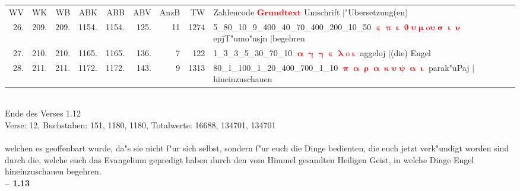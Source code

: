 \documentclass[a4paper,10pt,landscape]{article}
\begin{document}
\begin{tabular}{rrrrrrrrp{120mm}}
WV&WK&WB&ABK&ABB&ABV&AnzB&TW&Zahlencode \textcolor{red}{$\boldsymbol{Grundtext}$} Umschrift $|$"Ubersetzung(en)\\
26.&209.&209.&1154.&1154.&125.&11&1274&5\_80\_10\_9\_400\_40\_70\_400\_200\_10\_50 \textcolor{red}{$\boldsymbol{\upepsilon\uppi\upiota\upvartheta\upsilon\upmu\mathrm{o}\upsilon\upsigma\upiota\upnu}$} epjT"umo"usjn $|$begehren\\
27.&210.&210.&1165.&1165.&136.&7&122&1\_3\_3\_5\_30\_70\_10 \textcolor{red}{$\boldsymbol{\upalpha\upgamma\upgamma\upepsilon\uplambda\mathrm{o}\upiota}$} aggeloj $|$(die) Engel\\
28.&211.&211.&1172.&1172.&143.&9&1313&80\_1\_100\_1\_20\_400\_700\_1\_10 \textcolor{red}{$\boldsymbol{\uppi\upalpha\uprho\upalpha\upkappa\upsilon\uppsi\upalpha\upiota}$} parak"uPaj $|$hineinzuschauen\\
\end{tabular}\medskip \\
Ende des Verses 1.12\\
Verse: 12, Buchstaben: 151, 1180, 1180, Totalwerte: 16688, 134701, 134701\\
\\
welchen es geoffenbart wurde, da"s sie nicht f"ur sich selbst, sondern f"ur euch die Dinge bedienten, die euch jetzt verk"undigt worden sind durch die, welche euch das Evangelium gepredigt haben durch den vom Himmel gesandten Heiligen Geist, in welche Dinge Engel hineinzuschauen begehren.\\
\newpage 
{\bf -- 1.13}\\
\medskip \\
\end{document}
